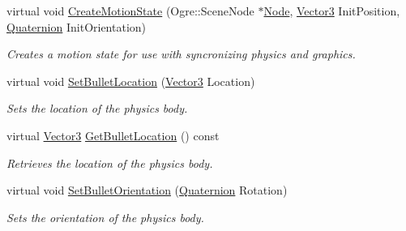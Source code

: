 \begin{DoxyCompactItemize}
virtual void \hyperlink{classphys_1_1ActorBase_ae002dd16cd0d7d2c3d3098f85920ae02}{CreateMotionState} (Ogre::SceneNode $\ast$\hyperlink{classNode}{Node}, \hyperlink{classphys_1_1Vector3}{Vector3} InitPosition, \hyperlink{classphys_1_1Quaternion}{Quaternion} InitOrientation)
\begin{DoxyCompactList}\small\item\em Creates a motion state for use with syncronizing physics and graphics. \item\end{DoxyCompactList}\item 
virtual void \hyperlink{classphys_1_1ActorBase_aa7ab524d2905e640cea6324cce9ccfdb}{SetBulletLocation} (\hyperlink{classphys_1_1Vector3}{Vector3} Location)
\begin{DoxyCompactList}\small\item\em Sets the location of the physics body. \item\end{DoxyCompactList}\item 
virtual \hyperlink{classphys_1_1Vector3}{Vector3} \hyperlink{classphys_1_1ActorBase_a9b32df1efdc346f5d6c0920b959c09a3}{GetBulletLocation} () const 
\begin{DoxyCompactList}\small\item\em Retrieves the location of the physics body. \item\end{DoxyCompactList}\item 
virtual void \hyperlink{classphys_1_1ActorBase_a492244ac46ced53b809f436da992bc84}{SetBulletOrientation} (\hyperlink{classphys_1_1Quaternion}{Quaternion} Rotation)
\begin{DoxyCompactList}\small\item\em Sets the orientation of the physics body. \item\end{DoxyCompactList}\end{DoxyCompactItemize}
